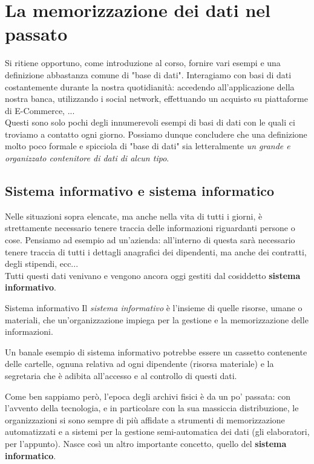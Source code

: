 \documentclass[12pt]{report}
\begin{document}
	
	
	\chapter{La memorizzazione dei dati nel passato}
	Si ritiene opportuno, come introduzione al corso, fornire vari esempi e una definizione abbastanza comune di "base di dati".
	Interagiamo con basi di dati costantemente durante la nostra quotidianità: accedendo all'applicazione della nostra banca, utilizzando i social network, effettuando un acquisto su piattaforme di E-Commerce, ...\\
	Questi sono solo pochi degli innumerevoli esempi di basi di dati con le quali ci troviamo a contatto ogni giorno. Possiamo dunque concludere che una definizione molto poco formale e spicciola di "base di dati" sia letteralmente \textit{un grande e organizzato contenitore di dati di alcun tipo}.
	
	\section{Sistema informativo e sistema informatico}
	Nelle situazioni sopra elencate, ma anche nella vita di tutti i giorni, è strettamente necessario tenere traccia delle informazioni riguardanti persone o cose. Pensiamo ad esempio ad un'azienda: all'interno di questa sarà necessario tenere traccia di tutti i dettagli anagrafici dei dipendenti, ma anche dei contratti, degli stipendi, ecc...\\
	Tutti questi dati venivano e vengono ancora oggi gestiti dal cosiddetto \textbf{sistema informativo}.
	
	\begin{definizione}{Sistema informativo}{}
		Il \textit{sistema informativo} è l'insieme di quelle risorse, umane o materiali, che un'organizzazione impiega per la gestione e la memorizzazione delle informazioni.
		
		Un banale esempio di sistema informativo potrebbe essere un cassetto contenente delle cartelle, ognuna relativa ad ogni dipendente (risorsa materiale) e la segretaria che è adibita all'accesso e al controllo di questi dati.
	\end{definizione}
	
	Come ben sappiamo però, l'epoca degli archivi fisici è da un po' passata: con l'avvento della tecnologia, e in particolare con la sua massiccia distribuzione, le organizzazioni si sono sempre di più affidate a strumenti di memorizzazione automatizzati e a sistemi per la gestione semi-automatica dei dati (gli elaboratori, per l'appunto).
	Nasce così un altro importante concetto, quello del \textbf{sistema informatico}.
	
\end{document}
